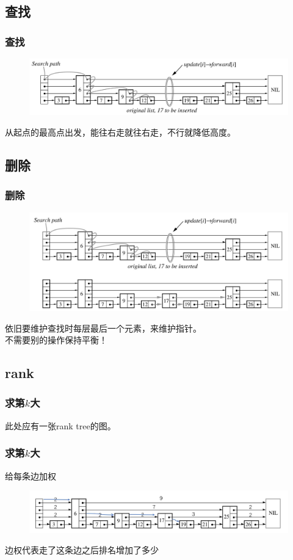 \documentclass{beamer}
\begin{document}
	\subsection{查找}
	\begin{frame}
		\frametitle{查找}
		\begin{figure}[H]
			\includegraphics[scale=0.25]{./img/insert.jpg}
		\end{figure}
		从起点的最高点出发，能往右走就往右走，不行就降低高度。
	\end{frame}

	\subsection{删除}
	\begin{frame}
		\frametitle{删除}
		\begin{figure}[H]
			\includegraphics[scale=0.25]{./img/find.jpg}
		\end{figure}
		依旧要维护查找时每层最后一个元素，来维护指针。\\
		不需要别的操作保持平衡！
	\end{frame}

	\subsection{rank}


	\begin{frame}
		\frametitle{求第$k$大}
		此处应有一张rank tree的图。
	\end{frame}

	\begin{frame}
		\frametitle{求第$k$大}
		给每条边加权
		\begin{figure}[H]
			\includegraphics[scale=0.27]{./img/rank.jpg}
		\end{figure}
		边权代表走了这条边之后排名增加了多少
	\end{frame}
\end{document}
